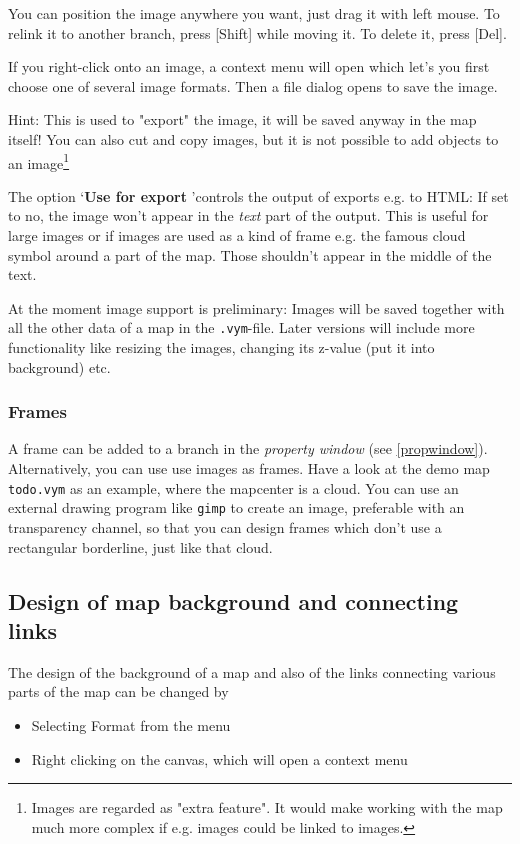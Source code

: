 \documentclass[12pt,a4paper]{article}
\newcommand{\key}[1]{[#1]}
\begin{document}
You can position the image anywhere you want, just drag it with left
mouse. To relink it to another branch, press \key{Shift} while moving
it. To delete it, press \key{Del}. 

If you right-click onto an image, a context menu will open which let's
you first choose one of several image formats. Then a file dialog opens
to save the image. 

Hint: This is used to "export" the image, it will be
saved anyway in the map itself! You can also cut and
copy images, but it is not possible to add objects to an image\footnote{
    Images are regarded as "extra feature". It would make working with
    the map much more complex if e.g. images could be linked to images.}

The option \lq{\bf Use for export} \rq controls the output of exports
e.g. to HTML: If set to no, the image won't appear in the {\em text}
part of the output. This is useful for large images or if images are
used as a kind of frame e.g. the famous cloud symbol around a part of
the map. Those shouldn't appear in the middle of the text.

At the moment image support is preliminary: Images will be saved
together with all the other data of a map in the {\tt .vym}-file.
Later versions will include more functionality like resizing the images,
changing its z-value (put it into background) etc.

\subsubsection*{Frames}
A frame can be added to a branch in the {\em property window} (see
\ref{propwindow}). 
Alternatively, you can use use images as frames. Have a look at the demo
map {\tt todo.vym} as an example, where the mapcenter is a cloud. You
can use an external drawing program like {\tt gimp} to create an image,
preferable with an transparency channel, so that you can design frames
which don't use a rectangular borderline, just like that cloud.


\subsection{Design of map background and connecting links }
The design of the background of a map and also of the links connecting
various parts of the map can be changed by
\begin{itemize}
    \item Selecting Format from the menu
    \item Right clicking on the canvas, which will open a context menu
\end{itemize}
\end{document}
